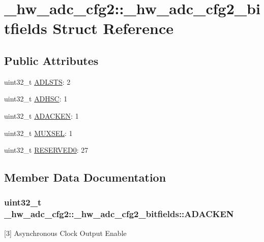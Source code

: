 \hypertarget{struct__hw__adc__cfg2_1_1__hw__adc__cfg2__bitfields}{}\section{\+\_\+hw\+\_\+adc\+\_\+cfg2\+:\+:\+\_\+hw\+\_\+adc\+\_\+cfg2\+\_\+bitfields Struct Reference}
\label{struct__hw__adc__cfg2_1_1__hw__adc__cfg2__bitfields}
\subsection*{Public Attributes}
\begin{DoxyCompactItemize}
\item 
uint32\+\_\+t \hyperlink{struct__hw__adc__cfg2_1_1__hw__adc__cfg2__bitfields_a07ae2b4f85c1ea830865629171563839}{A\+D\+L\+S\+TS}\+: 2
\item 
uint32\+\_\+t \hyperlink{struct__hw__adc__cfg2_1_1__hw__adc__cfg2__bitfields_a49fcc455b9f44002505aa30c3485e2df}{A\+D\+H\+SC}\+: 1
\item 
uint32\+\_\+t \hyperlink{struct__hw__adc__cfg2_1_1__hw__adc__cfg2__bitfields_a513579d889ea00f33a7e2cca1b5e5efe}{A\+D\+A\+C\+K\+EN}\+: 1
\item 
uint32\+\_\+t \hyperlink{struct__hw__adc__cfg2_1_1__hw__adc__cfg2__bitfields_a6aee43ed7fc373cb381eb1c441316991}{M\+U\+X\+S\+EL}\+: 1
\item 
uint32\+\_\+t \hyperlink{struct__hw__adc__cfg2_1_1__hw__adc__cfg2__bitfields_a954acbb2c955057b104e9c8790cdb4fb}{R\+E\+S\+E\+R\+V\+E\+D0}\+: 27
\end{DoxyCompactItemize}


\subsection{Member Data Documentation}
\subsubsection[{\texorpdfstring{A\+D\+A\+C\+K\+EN}{ADACKEN}}]{\setlength{\rightskip}{0pt plus 5cm}uint32\+\_\+t \+\_\+hw\+\_\+adc\+\_\+cfg2\+::\+\_\+hw\+\_\+adc\+\_\+cfg2\+\_\+bitfields\+::\+A\+D\+A\+C\+K\+EN}\hypertarget{struct__hw__adc__cfg2_1_1__hw__adc__cfg2__bitfields_a513579d889ea00f33a7e2cca1b5e5efe}{}\label{struct__hw__adc__cfg2_1_1__hw__adc__cfg2__bitfields_a513579d889ea00f33a7e2cca1b5e5efe}
\mbox{[}3\mbox{]} Asynchronous Clock Output Enable 
